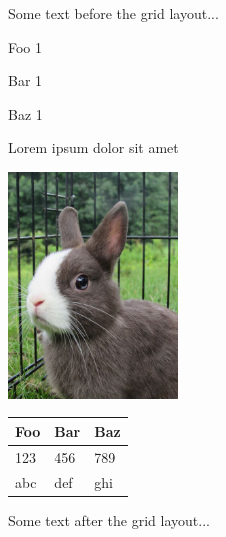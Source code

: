 \documentclass{article}
\begin{document}
Some text before the grid layout...

\begin{gridlayout}[\textwidth]
    \begin{row}{4cm}
        \begin{cell}{0.337}
            Foo 1
        \end{cell}
        \begin{cell}{0.072}
            Bar 1
        \end{cell}
        \begin{cell}{0.041}
            Baz 1
        \end{cell}
    \end{row}
    \begin{row}{6cm}
        \begin{cell}{0.211}
            Lorem ipsum dolor sit amet 
        \end{cell}
        \begin{cell}{0.5}
            \includegraphics[height = 6cm]{img/rabbit.jpg}
        \end{cell}
        \begin{cell}{0.289}
            \centering
            \begin{tabular}{lll}
                \toprule
                Foo & Bar & Baz \\
                \midrule
                123 & 456 & 789 \\
                abc & def & ghi \\
                \bottomrule
            \end{tabular}
        \end{cell}
    \end{row}
\end{gridlayout}

Some text after the grid layout...
\end{document}
